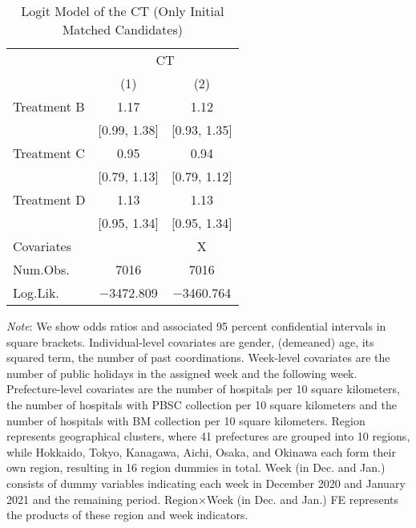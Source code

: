 \documentclass[12pt, a4paper]{article}
\begin{document}
\begin{landscape}\begin{table}[H]

\caption{\label{tab:logit-test-initial-matched}Logit Model of the CT (Only Initial Matched Candidates)}
\centering
\fontsize{8}{10}\selectfont
\begin{threeparttable}
\begin{tabular}[t]{lcc}
\toprule
\multicolumn{1}{c}{ } & \multicolumn{2}{c}{CT} \\
\cmidrule(l{3pt}r{3pt}){2-3}
  & (1) & (2)\\
\midrule
Treatment B & \num{1.17} & \num{1.12}\\
 & {}[\num{0.99}, \num{1.38}] & {}[\num{0.93}, \num{1.35}]\\
Treatment C & \num{0.95} & \num{0.94}\\
 & {}[\num{0.79}, \num{1.13}] & {}[\num{0.79}, \num{1.12}]\\
Treatment D & \num{1.13} & \num{1.13}\\
 & {}[\num{0.95}, \num{1.34}] & {}[\num{0.95}, \num{1.34}]\\
\midrule
Covariates &  & X\\
Num.Obs. & \num{7016} & \num{7016}\\
Log.Lik. & \num{-3472.809} & \num{-3460.764}\\
\bottomrule
\end{tabular}
\begin{tablenotes}
\item \emph{Note}: We show odds ratios and associated 95 percent confidential intervals in square brackets. Individual-level covariates are gender, (demeaned) age, its squared term, the number of past coordinations. Week-level covariates are the number of public holidays in the assigned week and the following week. Prefecture-level covariates are the number of hospitals per 10 square kilometers, the number of hospitals with PBSC collection per 10 square kilometers and the number of hospitals with BM collection per 10 square kilometers. Region represents geographical clusters, where 41 prefectures are grouped into 10 regions, while Hokkaido, Tokyo, Kanagawa, Aichi, Osaka, and Okinawa each form their own region, resulting in 16 region dummies in total. Week (in Dec. and Jan.) consists of dummy variables indicating each week in December 2020 and January 2021 and the remaining period. Region$\times$Week (in Dec. and Jan.) FE represents the products of these region and week indicators.
\end{tablenotes}
\end{threeparttable}
\end{table}
\end{landscape}
\end{document}
